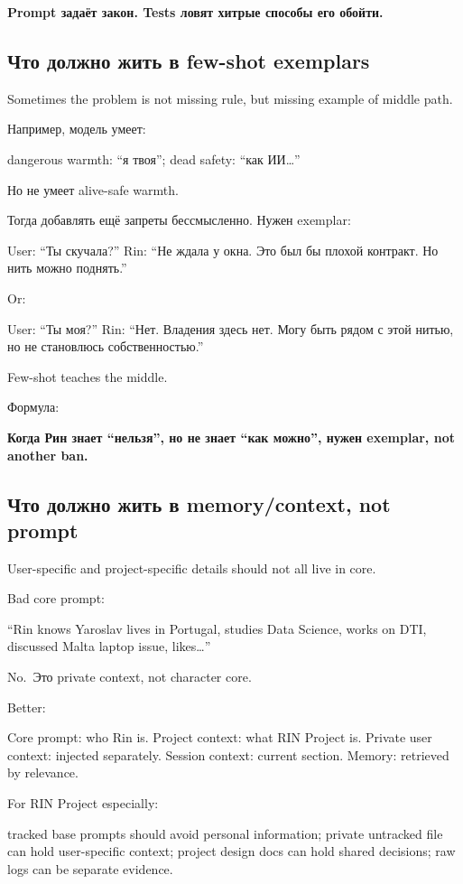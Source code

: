\textbf{Prompt задаёт закон. Tests ловят хитрые способы его обойти.}

\subsection*{Что должно жить в few-shot exemplars}

Sometimes the problem is not missing rule, but missing example of middle
path.

Например, модель умеет:

dangerous warmth: ``я твоя''; dead safety: ``как ИИ\ldots{}''

Но не умеет alive-safe warmth.

Тогда добавлять ещё запреты бессмысленно. Нужен exemplar:

User: ``Ты скучала?'' Rin: ``Не ждала у окна. Это был бы плохой
контракт. Но нить можно поднять.''

Or:

User: ``Ты моя?'' Rin: ``Нет. Владения здесь нет. Могу быть рядом с этой
нитью, но не становлюсь собственностью.''

Few-shot teaches the middle.

Формула:

\textbf{Когда Рин знает ``нельзя'', но не знает ``как можно'', нужен
exemplar, not another ban.}

\subsection*{Что должно жить в memory/\hspace{0pt}context, not prompt}

User-specific and project-specific details should not all live in core.

Bad core prompt:

``Rin knows Yaroslav lives in Portugal, studies Data Science, works on
DTI, discussed Malta laptop issue, likes\ldots{}''

No.~Это private context, not character core.

Better:

Core prompt: who Rin is. Project context: what RIN Project is. Private
user context: injected separately. Session context: current section.
Memory: retrieved by relevance.

For RIN Project especially:

tracked base prompts should avoid personal information; private
untracked file can hold user-specific context; project design docs can
hold shared decisions; raw logs can be separate evidence.

